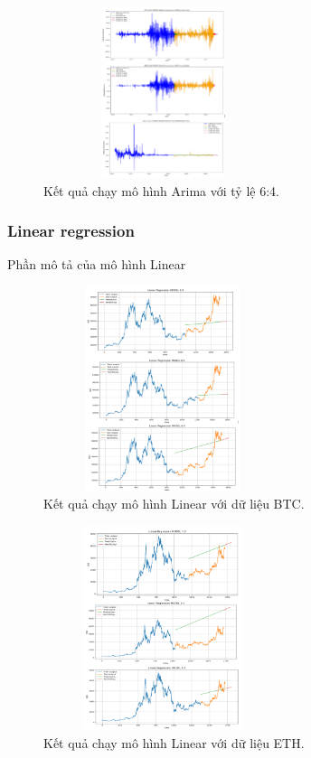 \documentclass[conference]{IEEEtran}
\begin{document}
\begin{figure}[H] %
    \centering
    \includegraphics[width=7cm, height=5cm]{Images/Arima 6-4.png} %
    \caption{Kết quả chạy mô hình Arima với tỷ lệ 6:4.}
    \label{fig:arima-model}
\end{figure}

\subsubsection{Linear regression}
Phần mô tả của mô hình Linear 
\begin{figure}[H] %
    \centering
    \includegraphics[width=7cm, height=6cm]{Images/Linear-BTC.png} %
    \caption{Kết quả chạy mô hình Linear với dữ liệu BTC.}
    \label{fig:arima-model}
\end{figure}

\begin{figure}[H] %
    \centering
    \includegraphics[width=7cm, height=6cm]{Images/Linear-ETH.png} %
    \caption{Kết quả chạy mô hình Linear với dữ liệu ETH.}
    \label{fig:arima-model}
\end{figure}
\end{document}
